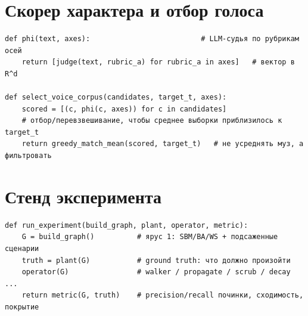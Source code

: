 \section{Скорер характера и отбор голоса}

\begin{lstlisting}[style=pseudo]
def phi(text, axes):                          # LLM-судья по рубрикам осей
    return [judge(text, rubric_a) for rubric_a in axes]   # вектор в R^d

def select_voice_corpus(candidates, target_t, axes):
    scored = [(c, phi(c, axes)) for c in candidates]
    # отбор/перевзвешивание, чтобы среднее выборки приблизилось к target_t
    return greedy_match_mean(scored, target_t)   # не усреднять муз, а фильтровать
\end{lstlisting}

\section{Стенд эксперимента}

\begin{lstlisting}[style=pseudo]
def run_experiment(build_graph, plant, operator, metric):
    G = build_graph()          # ярус 1: SBM/BA/WS + подсаженные сценарии
    truth = plant(G)           # ground truth: что должно произойти
    operator(G)                # walker / propagate / scrub / decay ...
    return metric(G, truth)    # precision/recall починки, сходимость, покрытие
\end{lstlisting}
